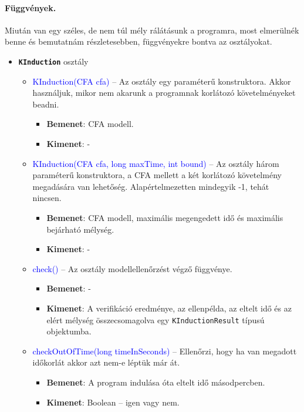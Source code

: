 \paragraph{Függvények.}
Miután van egy széles, de nem túl mély rálátásunk a programra, most elmerülnék benne és bemutatnám részletesebben, függvényekre bontva az osztályokat.
\begin{itemize}
	\item \textbf{\texttt{KInduction}} osztály
	\begin{itemize}
		\item \textcolor{blue}{KInduction(CFA cfa)} -- Az osztály egy paraméterű konstruktora. Akkor használjuk, mikor nem akarunk a programnak korlátozó követelményeket beadni.
		\begin{itemize}
			\item \textbf{Bemenet}: CFA modell.
			\item \textbf{Kimenet}: -
		\end{itemize}
	
		\item \textcolor{blue}{KInduction(CFA cfa, long maxTime, int bound)} -- Az osztály három paraméterű konstruktora, a CFA mellett a két korlátozó követelmény megadására van lehetőség. Alapértelmezetten mindegyik -1, tehát nincsen.
		\begin{itemize}
			\item \textbf{Bemenet}: CFA modell, maximális megengedett idő és maximális bejárható mélység.
			\item \textbf{Kimenet}: -
		\end{itemize}
	
		\item \textcolor{blue}{check()} -- Az osztály modellellenőrzést végző függvénye.
		\begin{itemize}
			\item \textbf{Bemenet}: -
			\item \textbf{Kimenet}: A verifikáció eredménye, az ellenpélda, az eltelt idő és az elért mélység összecsomagolva egy \texttt{KInductionResult} típusú objektumba.
		\end{itemize}
	
		\item \textcolor{blue}{checkOutOfTime(long timeInSeconds)} -- Ellenőrzi, hogy ha van megadott időkorlát akkor azt nem-e léptük már át.
		\begin{itemize}
			\item \textbf{Bemenet}: A program indulása óta eltelt idő másodpercben.
			\item \textbf{Kimenet}: Boolean -- igen vagy nem.
		\end{itemize}
	

\end{itemize}
\end{itemize}
